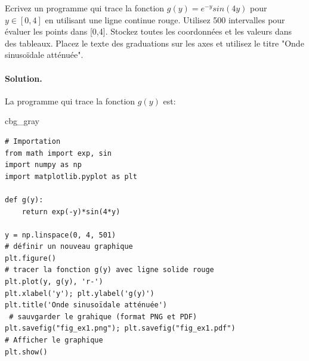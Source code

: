 \documentclass[%
oneside,                 %
final,                   %
10pt,french]{article}
\newenvironment{_cod_tight}[1]{
   \def\FrameCommand{\colorbox{#1}}
   \FrameRule0.6pt\MakeFramed {\FrameRestore}\vskip3mm}
   {\vskip0mm\endMakeFramed}
\newenvironment{cod}[1]{
\bgroup\rmfamily
\fboxsep=0mm\relax
\begin{_cod_tight}{#1}
\list{}{\parsep=-2mm\parskip=0mm\topsep=0pt\leftmargin=2mm
\rightmargin=2\leftmargin\leftmargin=4pt\relax}
\item\relax}
{\endlist\end{_cod_tight}\egroup}
\newenvironment{doconceexercise}{}{}
\newcounter{doconceexercisecounter}
\begin{document}
\begin{doconceexercise}



Ecrivez un programme qui trace la fonction $g(y) = e^{-y} sin(4y)$ pour $y \in [0, 4]$ en utilisant une ligne continue rouge. Utilisez 500 intervalles pour évaluer les points dans [0,4]. Stockez toutes les coordonnées et les valeurs dans des tableaux. Placez le texte des graduations sur les axes et utilisez le titre "Onde sinusoïdale atténuée".


\paragraph{Solution.}
La programme qui trace la fonction $g(y)$ est:
\begin{cod}{cbg_gray}\begin{verbatim}
# Importation
from math import exp, sin
import numpy as np
import matplotlib.pyplot as plt

def g(y):
    return exp(-y)*sin(4*y)

y = np.linspace(0, 4, 501)
# définir un nouveau graphique
plt.figure()
# tracer la fonction g(y) avec ligne solide rouge
plt.plot(y, g(y), 'r-')
plt.xlabel('y'); plt.ylabel('g(y)')
plt.title('Onde sinusoïdale atténuée')
 # sauvgarder le grahique (format PNG et PDF)
plt.savefig("fig_ex1.png"); plt.savefig("fig_ex1.pdf")
# Afficher le graphique
plt.show()
\end{verbatim}
\end{cod}
\noindent


\end{doconceexercise}
\end{document}
